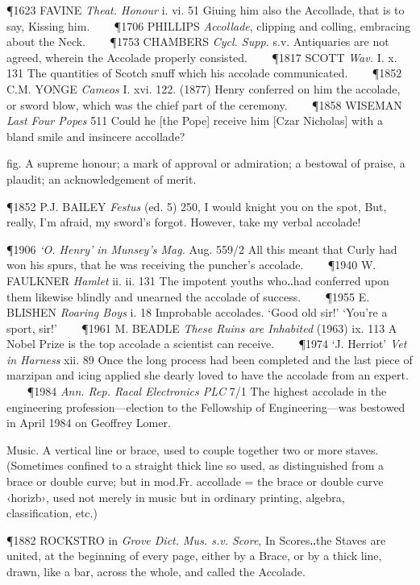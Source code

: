 \begin{description}[wide, labelwidth=!, labelindent=0pt]
\begin{myenumerate}
\P 1623 FAVINE \textit{Theat. Honour} i. vi. 51 Giuing him also the Accollade, that is to
say, Kissing him.    
\P 1706 PHILLIPS \textit{Accollade}, clipping and colling, embracing
about the Neck.    
\P 1753 CHAMBERS \textit{Cycl. Supp.} s.v. Antiquaries are not agreed,
wherein the Accolade properly consisted.    
\P 1817 SCOTT \textit{Wav.} I. x. 131 The
quantities of Scotch snuff which his accolade communicated.    
\P 1852 C.M. YONGE \textit{Cameos} I. xvi. 122. (1877) Henry conferred on him 
the accolade, or sword blow, which was the chief part of the ceremony.    
\P 1858 WISEMAN \textit{Last Four Popes} 511 Could he [the Pope] receive him 
[Czar Nicholas] with a bland smile and insincere
accollade?

 fig. A supreme honour; a mark of approval or admiration; a bestowal of
praise, a plaudit; an acknowledgement of merit. 

\P 1852 P.J. BAILEY \textit{Festus} (ed. 5) 250, I would knight you on the spot, But,
really, I'm afraid, my sword's forgot. However, take my verbal accolade!    

\P 1906 \textit{‘O. Henry’ in Munsey's Mag.} Aug. 559/2 All this meant that Curly had won his
spurs, that he was receiving the puncher's accolade.    
\P 1940 W. FAULKNER \textit{Hamlet} ii. ii. 131 The impotent youths who‥had 
conferred upon them likewise blindly and unearned the accolade of success.    
\P 1955 E. BLISHEN \textit{Roaring Boys} i. 18
Improbable accolades. ‘Good old sir!’ ‘You're a sport, sir!’    
\P 1961 M. BEADLE \textit{These Ruins are Inhabited} (1963) ix. 113 A Nobel Prize 
is the top accolade a scientist can receive.    
\P 1974 ‘J. Herriot’ \textit{Vet in Harness} xii. 89 Once the long
process had been completed and the last piece of marzipan and icing applied she
dearly loved to have the accolade from an expert.    
\P 1984 \textit{Ann. Rep. Racal Electronics PLC} 7/1 The highest accolade in the 
engineering profession—election
to the Fellowship of Engineering—was bestowed in April 1984 on Geoffrey Lomer.

 Music. A vertical line or brace, used to couple together two or more staves.
(Sometimes confined to a straight thick line so used, as distinguished from a
brace or double curve; but in mod.Fr. accollade = the brace or double curve
‹horizb›, used not merely in music but in ordinary printing, algebra,
classification, etc.) 

\P 1882 ROCKSTRO in \textit{Grove Dict. Mus. s.v. Score}, In Scores‥the Staves are
united, at the beginning of every page, either by a Brace, or by a thick line,
drawn, like a bar, across the whole, and called the Accolade.
\end{myenumerate}


\end{description}
